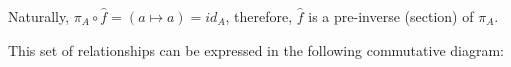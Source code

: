 \documentclass[12pt, letterpaper, twoside]{report}
\begin{document}
Naturally, $\pi_A \circ \hat{f} = (a \mapsto a) = id_A$, therefore, $\hat{f}$ is a pre-inverse (section) of $\pi_A$.

This set of relationships can be expressed in the following commutative diagram:

\end{document}

